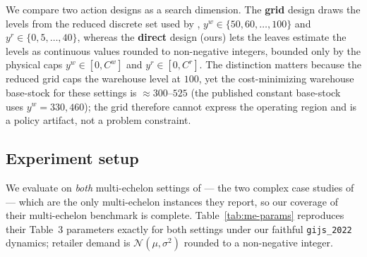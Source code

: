 \documentclass[11pt]{article}
\begin{document}
We compare two action designs as a search dimension. The \textbf{grid} design draws the levels from
the reduced discrete set used by \citet{gijsbrechts2022drl}, $y^w\in\{50,60,\dots,100\}$ and
$y^r\in\{0,5,\dots,40\}$, whereas the \textbf{direct} design (ours) lets the leaves estimate the
levels as continuous values rounded to non-negative integers, bounded only by the physical caps
$y^w\in[0,C^w]$ and $y^r\in[0,C^r]$. The distinction matters because the reduced grid caps the
warehouse level at $100$, yet the cost-minimizing warehouse base-stock for these settings is
$\approx 300$--$525$ (the published constant base-stock uses $y^w=330,460$); the grid therefore
cannot express the operating region and is a policy artifact, not a problem constraint.

\subsection{Experiment setup}

We evaluate on \emph{both} multi-echelon settings of \citet{gijsbrechts2022drl} --- the two complex
case studies of \citet{vanroy1997ndp} --- which are the only multi-echelon instances they report, so
our coverage of their multi-echelon benchmark is complete. Table~\ref{tab:me-params} reproduces
their Table~3 parameters exactly for both settings under our faithful \texttt{gijs\_2022} dynamics;
retailer demand is $\mathcal{N}(\mu,\sigma^2)$ rounded to a non-negative integer.
\end{document}
